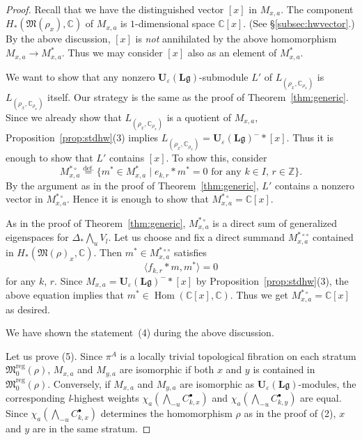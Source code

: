 \documentclass[12pt]{amsart}
\def\Bbb{\mathbb}
\def\frak{\mathfrak}
\theoremstyle{definition}
\theoremstyle{remark}
\numberwithin{equation}{subsection}
\newcommand{\thmref}[1]{Theorem~\ref{#1}}
\newcommand{\propref}[1]{Proposition~\ref{#1}}
\newcommand{\subsecref}[1]{\S\ref{#1}}
\newcommand{\defeq}{\overset{\operatorname{\scriptstyle def.}}{=}}
\newcommand{\C}{{\Bbb C}}
\newcommand{\Z}{{\Bbb Z}}
\newcommand{\Hom}{\operatorname{Hom}}
\newcommand{\M}{{\frak M}} %
\newcommand{\Mreg}{{\frak M_0^{\operatorname{reg}}}}
\newcommand{\Ule}{{\mathbf U}_{\varepsilon}({\mathbf L}\mathfrak g)}
\newcommand{\Wedge}{{\textstyle \bigwedge}}
\begin{document}
\begin{proof}
Recall that we have the distinguished vector $[x]$ in $M_{x,a}$. The
component $H_*(\M(\rho_x),\C)$ of $M_{x,a}$ is $1$-dimensional space
$\C[x]$. (See \subsecref{subsec:hwvector}.) By the above discussion,
$[x]$ is {\it not\/} annihilated by the above homomorphism
$M_{x,a} \to M_{x,a}^*$. Thus we may consider
$[x]$ also as an element of $M_{x,a}^*$.

We want to show that any nonzero $\Ule$-submodule $L'$ of
$L_{(\rho_x,\C_{\rho_x})}$ is $L_{(\rho_x,\C_{\rho_x})}$ itself.
Our strategy is the same as the proof of \thmref{thm:generic}.
Since we already show that $L_{(\rho_x,\C_{\rho_x})}$ is a quotient
of $M_{x,a}$, \propref{prop:stdhw}(3) implies
$L_{(\rho_x,\C_{\rho_x})} = \Ule^-\ast [x]$. Thus it is enough to show 
that $L'$ contains $[x]$. To show this, consider
\begin{equation*}
   M_{x,a}^{*\circ} \defeq \{ m^*\in M^*_{x,a} \mid
    \text{$e_{k,r}\ast m^* = 0$ for any $k\in I$, $r\in\Z$} \}.
\end{equation*}
By the argument as in the proof of \thmref{thm:generic}, $L'$ contains
a nonzero vector in $M_{x,a}^{*\circ}$. Hence it is enough to show
that $M_{x,a}^{*\circ} = \C[x]$.

As in the proof of \thmref{thm:generic}, $M_{x,a}^{*\circ}$ is a
direct sum of generalized eigenspaces for $\Delta_*\Wedge_u V_l$. Let
us choose and fix a direct summand $M_{x,a}^{*\circ\circ}$ contained
in $H_*(\M(\rho)_x,\C)$.
%
Then $m^*\in M_{x,a}^{*\circ\circ}$ satisfies
\begin{equation*}
  \langle f_{k,r}\ast m, m^*\rangle = 0
\end{equation*}
for any $k$, $r$.
%
Since $M_{x,a} = \Ule^-\ast [x]$ by \propref{prop:stdhw}(3), the above 
equation implies that $m^*\in \Hom(\C[x],\C)$. Thus we get
$M_{x,a}^{*\circ} = \C[x]$ as desired.

We have shown the statement~(4) during the above discussion.

Let us prove (5). Since $\pi^A$ is a locally trivial topological
fibration on each stratum $\Mreg(\rho)$, $M_{x,a}$ and $M_{y,a}$ are
isomorphic if both $x$ and $y$ is contained in
$\Mreg(\rho)$. Conversely, if $M_{x,a}$ and $M_{y,a}$ are
isomorphic as $\Ule$-modules, the corresponding {\it l\/}-highest
weights $\chi_a\left(\Wedge_{-u} C_{k,x}^\bullet\right)$
and $\chi_a\left(\Wedge_{-u} C_{k,y}^\bullet\right)$ are equal.
Since $\chi_a\left(\Wedge_{-u} C_{k,x}^\bullet\right)$ determines the
homomorphism $\rho$ as in the proof of (2), $x$ and $y$ are in the
same stratum.
\end{proof}
\end{document}
